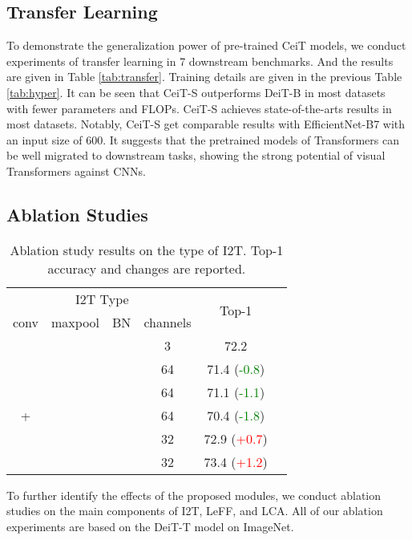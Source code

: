 \documentclass[10pt,twocolumn,letterpaper]{article}
\newcommand{\cmark}{\ding{51}}
\newcommand{\xmark}{\ding{55}}
\begin{document}
\subsection{Transfer Learning}\label{sec:exp_transfer}

To demonstrate the generalization power of pre-trained CeiT models, we conduct experiments of transfer learning in 7 downstream benchmarks. And the results are given in Table \ref{tab:transfer}. Training details are given in the previous Table \ref{tab:hyper}. It can be seen that CeiT-S outperforms DeiT-B in most datasets with fewer parameters and FLOPs. CeiT-S achieves state-of-the-arts results in most datasets. Notably, CeiT-S get comparable results with EfficientNet-B7 with an input size of 600. 
It suggests that the pretrained models of Transformers can be well migrated to downstream tasks, showing the strong potential of visual Transformers against CNNs.

\subsection{Ablation Studies}\label{sec:exp_ablation}

\begin{table}[t]
    \centering
    \footnotesize
    \caption{Ablation study results on the type of I2T. Top-1 accuracy and changes are reported.}
    \begin{tabular}{cccccc}
         \toprule
         \multicolumn{4}{c}{I2T Type} & \multirow{2}{*}{Top-1} \\
         \cmidrule{1-4}
         conv & maxpool & BN & channels & \\
         \midrule
         \xmark & \xmark & \xmark & 3 & 72.2 \\
         \midrule
          & \xmark & \xmark & 64 & 71.4 (\textcolor{Green}{-0.8}) \\
          & \xmark & \xmark & 64 & 71.1 (\textcolor{Green}{-1.1}) \\
          +  & \xmark & \xmark & 64 & 70.4 (\textcolor{Green}{-1.8}) \\
          &  & \xmark & 32 & 72.9 (\textcolor{Red}{+0.7}) \\
          &  & \cmark & 32 & 73.4 (\textcolor{Red}{+1.2}) \\
         \bottomrule
    \end{tabular}
    \label{tab:i2t}
\end{table}
To further identify the effects of the proposed modules, we conduct ablation studies on the main components of I2T, LeFF, and LCA. All of our ablation experiments are based on the DeiT-T model on ImageNet.
\end{document}
